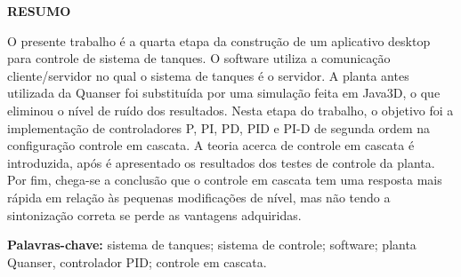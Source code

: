 \documentclass[a4paper,12pt]{article}
\begin{document}
\newpage


\thispagestyle{empty}

\begin{center}
{\large \textbf{RESUMO}}
\end{center}

\vspace{3cm}

\begin{flushleft}

\hspace{4ex}O presente trabalho é a quarta etapa da construção de um aplicativo desktop para controle de sistema de tanques. O software utiliza a comunicação cliente/servidor no qual o sistema de tanques é o servidor. A planta antes utilizada da Quanser foi substituída por uma simulação feita em Java3D, o que eliminou o nível de ruído dos resultados. Nesta etapa do trabalho, o objetivo foi a implementação de controladores P, PI, PD, PID e PI-D de segunda ordem na configuração controle em cascata. A teoria acerca de controle em cascata é introduzida, após é apresentado os resultados dos testes de controle da planta. Por fim, chega-se a conclusão que o controle em cascata tem uma resposta mais rápida em relação às pequenas modificações de nível, mas não tendo a sintonização correta se perde as vantagens adquiridas. \\

\end{flushleft}

\vspace{1.5cm}

\textbf{Palavras-chave:} sistema de tanques; sistema de controle; software; planta Quanser, controlador PID; controle em cascata.

\newpage


\thispagestyle{empty}

\begin{center}
\listoffigures
\end{center}

\newpage


\thispagestyle{empty}

\begin{center}
\tableofcontents
\end{center}

\newpage
\end{document}
